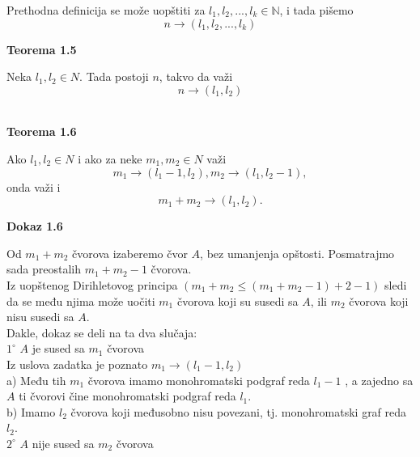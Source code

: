 \documentclass[12pt,a4paper]{article}
\begin{document}
	\noindent Prethodna definicija se može uopštiti za $l_1, l_2, ... , l_k  \in \mathbb{N}$, i tada pišemo \[n \rightarrow (l_1, l_2, ... , l_k)\]
	\vspace{0.5em}

	

	{\noindent\fontsize{12pt}{12pt}\textbf{Teorema 1.5}}
	\vspace{0.5em}

	\noindent	Neka $l_{1}, l_{2} \in N$. Tada postoji $n$, takvo da važi
	\[n \rightarrow (l_{1}, l_{2})\]
	\vspace{1.5em}\

	{\noindent\fontsize{12pt}{12pt}\textbf{Teorema 1.6}}
	\vspace{0.5em}

	\noindent	Ako $l_{1}, l_{2} \in N$ i ako za neke $m_{1}, m_{2} \in N$ važi	
	\[m_{1} \rightarrow (l_{1}-1, l_{2}), m_{2} \rightarrow (l_{1}, l_{2}-1) ,\]
	onda važi i
	\[m_{1} + m_{2} \rightarrow (l_{1}, l_{2}).\]
	\vspace{1.5em}

	{\noindent\fontsize{12pt}{12pt}\textbf{Dokaz 1.6}}
	\vspace{0.5em}

	\noindent	Od $m_{1}+m_{2}$ čvorova izaberemo čvor $A$, bez umanjenja opštosti. Posmatrajmo sada preostalih $m_1+m_2-1$ čvorova.\\ Iz uopštenog Dirihletovog principa $(m_{1}+m_{2} \leq (m_{1}+m_{2}-1)+2-1)$ sledi da se
	među njima može uočiti $m_1$ čvorova koji su susedi sa $A$, ili $m_2$ čvorova koji nisu susedi sa $A$.\\
	

	\vspace{-0.4em}
	\noindent Dakle, dokaz se deli na ta dva slučaja:\\


	\noindent $1^\circ $ $A$ je sused sa $m_{1}$ čvorova\\
	
	Iz uslova zadatka je poznato $m_{1} \rightarrow (l_{1}-1, l_{2})$\\
	\indent a) Među tih $m_1$ čvorova imamo monohromatski podgraf reda $l_{1}-1$ , a zajedno sa $A$ ti čvorovi čine monohromatski podgraf reda  $l_{1}$. \\
	\indent b) Imamo $l_{2}$ čvorova koji međusobno nisu povezani, tj. monohromatski graf reda $l_{2}$.\\

	\vspace{0.5em}
	\noindent $2^\circ$ $A$ nije sused  sa  $m_{2}$ čvorova\\
	
\end{document}
